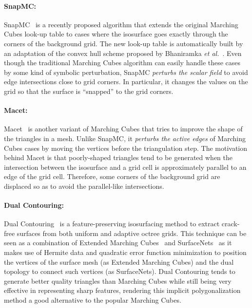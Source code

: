 \paragraph*{SnapMC:} SnapMC~\cite{Raman:2008:QIM} is a recently proposed algorithm
that extends the original Marching Cubes look-up table to cases where
the isosurface goes exactly through the corners of the background
grid.  The new look-up table is automatically built by an adaptation of
the convex hull scheme proposed by
Bhaniramka {\em et al.}~\cite{bhaniramka04}. Even though the traditional Marching
Cubes algorithm can easily handle these cases by some kind of symbolic
perturbation, SnapMC \emph{perturbs the scalar field} to avoid edge
intersections close to grid corners. In particular, it changes
the values on the grid so that the surface is ``snapped'' to the grid
corners.

\paragraph*{Macet:} Macet~\cite{Dietrich:TVCG:2008} is another variant of Marching
Cubes that tries to improve the shape of the triangles in a
mesh. Unlike SnapMC, it \emph{perturbs the active edges} of Marching Cubes
cases by moving the vertices before the triangulation step.  The
motivation behind Macet is that poorly-shaped triangles tend to be
generated when the intersection between the isosurface and a grid cell
is approximately parallel to an edge of the grid cell. Therefore, some
corners of the background grid are displaced so as to avoid the
parallel-like intersections.

\paragraph*{Dual Contouring:} Dual Contouring~\cite{Ju02} is a feature-preserving
isosurfacing method to extract crack-free surfaces from both uniform
and adaptive octree grids. This technique can be seen as a combination of
Extended Marching Cubes~\cite{kobbelt01} and SurfaceNets~\cite{gibson98} 
as it makes use of Hermite data and quadratic error function minimization 
to position the vertices of the surface mesh (as Extended Marching Cubes) 
and the dual topology to connect such vertices (as SurfaceNets).  Dual 
Contouring tends to generate better quality triangles than Marching Cubes 
while still being very effective in representing sharp features, rendering this
implicit polygonalization method a good alternative to the popular Marching Cubes.

